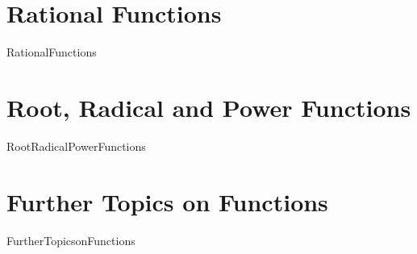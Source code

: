 
\clearpage


\tableofcontents

%

%

\mainmatter
 

\renewcommand{\chaptername}{Chapter}

\restoregeometry



\chapter{Rational Functions}
\label{RationalFunctions}
\thispagestyle{empty}
{RationalFunctions}

\chapter{Root, Radical and Power Functions}
\label{RootRadicalPowerFunctions}
\thispagestyle{empty}
{RootRadicalPowerFunctions}

\chapter{Further Topics on Functions}
\label{FurtherTopicsonFunctions}
\thispagestyle{empty}
{FurtherTopicsonFunctions}

